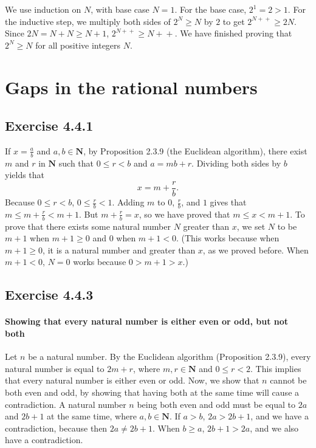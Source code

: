 \documentclass[12pt, oneside]{book}
\newcommand{\increment}{\! + \! +}
\begin{document}
	We use induction on $N$, with base case $N = 1$. For the base case, $2^1 = 2 > 1$. For the inductive step, we multiply both sides of $2^N \ge N$ by $2$ to get $2^{N \increment} \ge 2N$. Since $2N = N + N \ge N + 1$, $2^{N \increment} \ge N \increment$. We have finished proving that $2^N \ge N$ for all positive integers $N$.

	\section{Gaps in the rational numbers}

	\subsection*{Exercise 4.4.1}

	If $x = \frac{a}{b}$ and $a, b \in \mathbf{N}$, by Proposition 2.3.9 (the Euclidean algorithm), there exist $m$ and $r$ in $\mathbf{N}$ such that $0 \le r < b$ and $a = mb + r$. Dividing both sides by $b$ yields that
	\[x = m + \frac{r}{b}.\]
	Because $0 \le r < b$, $0 \le \frac{r}{b} < 1$. Adding $m$ to $0$, $\frac{r}{b}$, and $1$ gives that $m \le m + \frac{r}{b} < m + 1$. But $m + \frac{r}{b} = x$, so we have proved that $m \le x < m + 1$. To prove that there exists some natural number $N$ greater than $x$, we set $N$ to be $m + 1$ when $m + 1 \ge 0$ and $0$ when $m + 1 < 0$. (This works because when $m + 1 \ge 0$, it is a natural number and greater than $x$, as we proved before. When $m + 1 < 0$, $N = 0$ works because $0 > m + 1 > x$.)

	\subsection*{Exercise 4.4.3}

	\paragraph*{Showing that every natural number is either even or odd, but not both} Let $n$ be a natural number. By the Euclidean algorithm (Proposition 2.3.9), every natural number is equal to $2m + r$, where $m, r \in \mathbf{N}$ and $0 \le r < 2$. This implies that every natural number is either even or odd. Now, we show that $n$ cannot be both even and odd, by showing that having both at the same time will cause a contradiction. A natural number $n$ being both even and odd must be equal to $2a$ and $2b + 1$ at the same time, where $a, b \in \mathbf{N}$. If $a > b$, $2a > 2b + 1$, and we have a contradiction, because then $2a \ne 2b + 1$. When $b \ge a$, $2b + 1 > 2a$, and we also have a contradiction.
\end{document}
